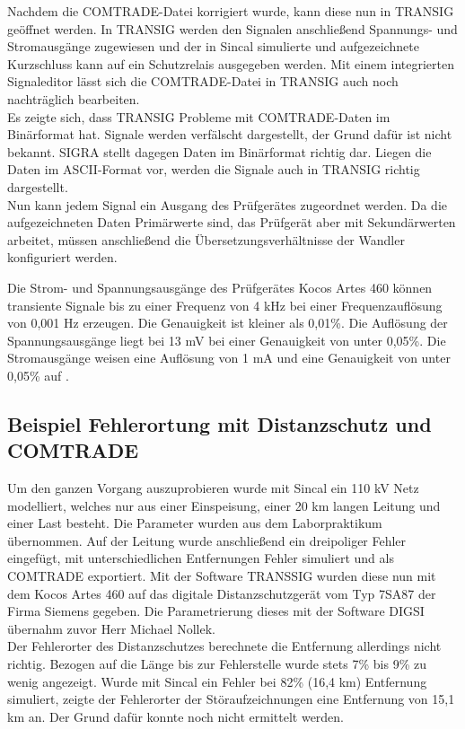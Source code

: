 \documentclass{scrartcl}
\begin{document}
\begin{onehalfspace}
Nachdem die COMTRADE-Datei korrigiert wurde, kann diese nun in TRANSIG geöffnet werden. In TRANSIG werden den Signalen anschließend Spannungs- und Stromausgänge zugewiesen und der in Sincal simulierte und aufgezeichnete Kurzschluss kann auf ein Schutzrelais ausgegeben werden. Mit einem integrierten Signaleditor lässt sich die COMTRADE-Datei in TRANSIG auch noch nachträglich bearbeiten. \\
Es zeigte sich, dass TRANSIG Probleme mit COMTRADE-Daten im Binärformat hat. Signale werden verfälscht dargestellt, der Grund dafür ist nicht bekannt. SIGRA stellt dagegen Daten im Binärformat richtig dar. Liegen die Daten im ASCII-Format vor, werden die Signale auch in TRANSIG richtig dargestellt. \\
Nun kann jedem Signal ein Ausgang des Prüfgerätes zugeordnet werden. Da die aufgezeichneten Daten Primärwerte sind, das Prüfgerät aber mit Sekundärwerten arbeitet, müssen anschließend die Übersetzungsverhältnisse der Wandler konfiguriert werden.

Die Strom- und Spannungsausgänge des Prüfgerätes Kocos Artes 460 können transiente Signale bis zu einer Frequenz von 4 kHz bei einer Frequenzauflösung von 0,001 Hz erzeugen. Die Genauigkeit ist kleiner als 0,01\%. Die Auflösung der Spannungsausgänge liegt bei 13 mV bei einer Genauigkeit von unter 0,05\%. Die Stromausgänge weisen eine Auflösung von 1 mA und eine Genauigkeit von unter 0,05\% auf \cite[S. 35]{artes-brochuere}.


\subsection{Beispiel Fehlerortung mit Distanzschutz und COMTRADE}
Um den ganzen Vorgang auszuprobieren wurde mit Sincal ein 110 kV Netz modelliert, welches nur aus einer Einspeisung, einer 20 km langen Leitung und einer Last besteht. Die Parameter wurden aus dem Laborpraktikum übernommen. Auf der Leitung wurde anschließend ein dreipoliger Fehler eingefügt, mit unterschiedlichen Entfernungen Fehler simuliert und als COMTRADE exportiert. Mit der Software TRANSSIG wurden diese nun mit dem Kocos Artes 460 auf das digitale Distanzschutzgerät vom Typ 7SA87 der Firma Siemens gegeben. Die Parametrierung dieses mit der Software DIGSI übernahm zuvor Herr Michael Nollek. \\
Der Fehlerorter des Distanzschutzes berechnete die Entfernung allerdings nicht richtig. Bezogen auf die Länge bis zur Fehlerstelle wurde stets 7\% bis 9\% zu wenig angezeigt. Wurde mit Sincal ein Fehler bei 82\% (16,4 km) Entfernung simuliert, zeigte der Fehlerorter der Störaufzeichnungen eine Entfernung von 15,1 km an. Der Grund dafür konnte noch nicht ermittelt werden.


\end{onehalfspace}
\end{document}
